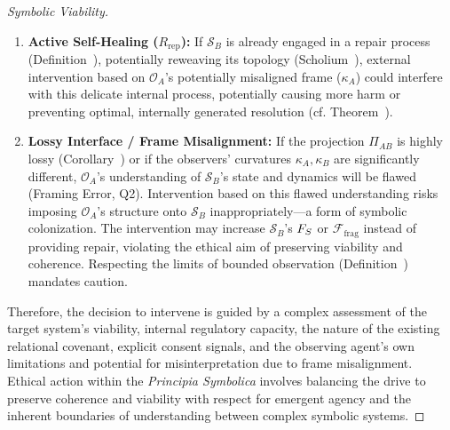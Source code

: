 \begin{proof}[Symbolic Viability]
\begin{enumerate}
    \item \textbf{Active Self-Healing ($R_{\text{rep}}$):} If $\mathcal{S}_B$ is already engaged in a repair process (Definition~), potentially reweaving its topology (Scholium~), external intervention based on $\mathcal{O}_A$'s potentially misaligned frame ($\kappa_A$) could interfere with this delicate internal process, potentially causing more harm or preventing optimal, internally generated resolution (cf. Theorem~).
    \item \textbf{Lossy Interface / Frame Misalignment:} If the projection $\Pi_{AB}$ is highly lossy (Corollary~) or if the observers' curvatures $\kappa_A, \kappa_B$ are significantly different, $\mathcal{O}_A$'s understanding of $\mathcal{S}_B$'s state and dynamics will be flawed (Framing Error, Q2). Intervention based on this flawed understanding risks imposing $\mathcal{O}_A$'s structure onto $\mathcal{S}_B$ inappropriately—a form of symbolic colonization. The intervention may increase $\mathcal{S}_B$'s $F_S$ or $\mathcal{F}_{\text{frag}}$ instead of providing repair, violating the ethical aim of preserving viability and coherence. Respecting the limits of bounded observation (Definition~) mandates caution.
\end{enumerate}
Therefore, the decision to intervene is guided by a complex assessment of the target system's viability, internal regulatory capacity, the nature of the existing relational covenant, explicit consent signals, and the observing agent's own limitations and potential for misinterpretation due to frame misalignment. Ethical action within the \textit{Principia Symbolica} involves balancing the drive to preserve coherence and viability with respect for emergent agency and the inherent boundaries of understanding between complex symbolic systems.
\end{proof}
